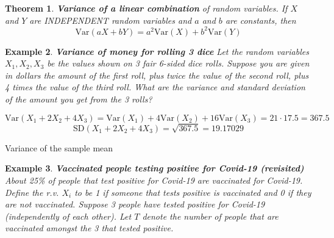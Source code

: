 \documentclass[12pt]{amsart}
\newtheorem{theorem}{Theorem}[section]
\newtheorem{example}[theorem]{Example}
\begin{document}
{\newpage
\begin{theorem}{\textbf{Variance of a linear combination} of random variables.} \newline
If $X$ and $Y$ are INDEPENDENT random variables and $a$ and $b$ are constants, then 
\color{blue}
$$\text{Var}(aX + bY) = a^2 \text{Var}(X) + b^2\text{Var}(Y)$$
\color{black}
\vspace{.5cm}


\end{theorem}

\begin{example}  \textbf{Variance of money for rolling 3 dice} \newline
Let the random variables $X_1, X_2, X_3$ be the values shown on 3 fair 6-sided dice rolls. \newline 
Suppose you are given in dollars the amount of the first roll, plus twice the value of the second roll, plus 4 times the value of the third roll. \newline 
What are the variance and standard deviation of the amount you get from the 3 rolls?  \newline 



\color{blue}
$$\text{Var}(X_1 + 2X_2 + 4X_3) = \text{Var}(X_1) + 4\text{Var}(X_2) + 16\text{Var}(X_3) = 21\cdot 17.5 = 367.5$$
\vspace{1cm}
$$\text{SD}(X_1 + 2X_2 + 4X_3) = \sqrt{367.5} =19.17029 $$
\color{black}
\end{example} 



\vspace{1cm}
\color{blue}
Variance of the sample mean
\color{black}


 \newpage

\begin{example}\label{VaccBinom}  \textbf{Vaccinated people testing positive for Covid-19 (revisited)} \newline
About 25\% of people that test positive for Covid-19 are vaccinated for Covid-19.\newline
Define the r.v. $X_i$ to be 1 if someone that tests positive is vaccinated and 0 if they are not vaccinated. \newline
Suppose 3 people have tested positive for Covid-19 (independently of each other). \newline
Let $T$ denote the number of people that are vaccinated amongst the 3 that tested positive.



\end{example}}
\end{document}
